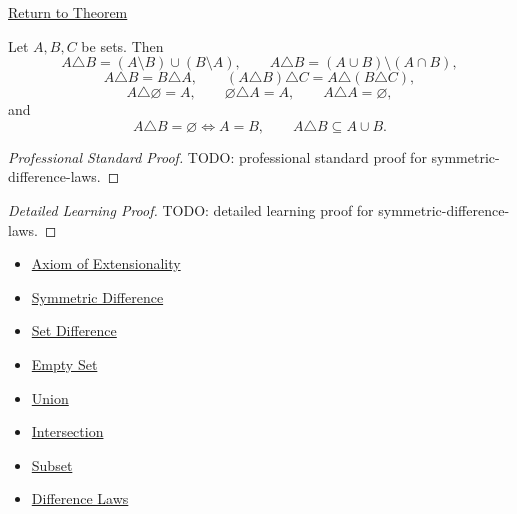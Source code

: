 \newpage
{}
\label{prf:symmetric-difference-laws}

\begin{remark*}[Return]
\hyperref[thm:symmetric-difference-laws]{Return to Theorem}
\end{remark*}

\begin{theorem*}
Let $A,B,C$ be sets. Then
\[
A\triangle B=(A\setminus B)\cup(B\setminus A),
\qquad
A\triangle B=(A\cup B)\setminus(A\cap B),
\]
\[
A\triangle B=B\triangle A,
\qquad
(A\triangle B)\triangle C=A\triangle(B\triangle C),
\]
\[
A\triangle\varnothing=A,
\qquad
\varnothing\triangle A=A,
\qquad
A\triangle A=\varnothing,
\]
and
\[
A\triangle B=\varnothing\iff A=B,
\qquad
A\triangle B\subseteq A\cup B.
\]
\end{theorem*}

\begin{proof}[Professional Standard Proof]
\LRAProofBodyStart
TODO: professional standard proof for symmetric-difference-laws.
\end{proof}

\begin{proof}[Detailed Learning Proof]
\LRAProofBodyStart
TODO: detailed learning proof for symmetric-difference-laws.
\end{proof}

\begin{remark*}
\end{remark*}

\begin{dependencies}
\begin{itemize}
  \item \hyperref[ax:extensionality]{Axiom of Extensionality}
  \item \hyperref[def:sym-diff]{Symmetric Difference}
  \item \hyperref[def:set-difference]{Set Difference}
  \item \hyperref[def:empty-set]{Empty Set}
  \item \hyperref[def:union]{Union}
  \item \hyperref[def:intersection]{Intersection}
  \item \hyperref[def:subset]{Subset}
  \item \hyperref[thm:difference-laws]{Difference Laws}
\end{itemize}
\end{dependencies}

\clearpage
